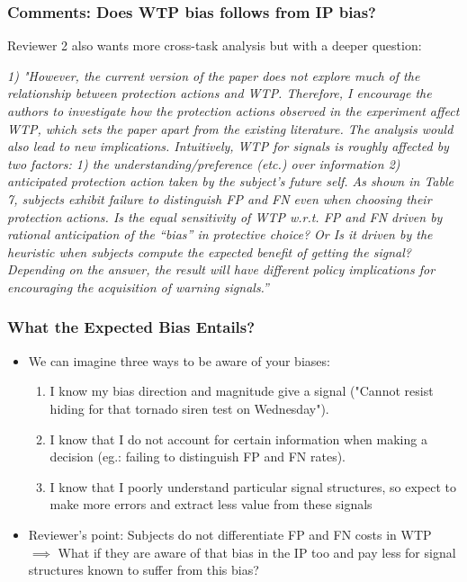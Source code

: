 \documentclass[11pt,hyperref={bookmarks=false}]{beamer}
\begin{document}
\begin{frame}
\frametitle{Comments: Does WTP bias follows from IP bias?}

\parbox{\textwidth} {Reviewer 2 also wants more cross-task analysis but with a deeper question:}
\par
\vspace{1em}
\footnotesize
\parbox{\textwidth}{\textit{1) "However, the current version of the paper does not explore much of the relationship
between protection actions and WTP. Therefore, I encourage the authors to investigate
how the protection actions observed in the experiment affect WTP, which sets
the paper apart from the existing literature. The analysis would also lead to new
implications. Intuitively, WTP for signals is roughly affected by two factors: 1) the
understanding/preference (etc.) over information 2) anticipated protection action
taken by the subject’s future self. As shown in Table 7, subjects exhibit failure to 
distinguish FP and FN even when choosing their protection actions. Is the equal
sensitivity of WTP w.r.t. FP and FN driven by rational anticipation of the “bias”
in protective choice? Or Is it driven by the heuristic when subjects compute the
expected benefit of getting the signal? Depending on the answer, the result will
have different policy implications for encouraging the acquisition of warning signals.”}}
\vspace{10pt}

\end{frame}


\begin{frame}
\frametitle{What the Expected Bias Entails?}

\begin{itemize}
\item We can imagine three ways to be aware of your biases:
\begin{enumerate}
\item  I know my bias direction and magnitude give a signal ("Cannot resist hiding for that  tornado siren test on Wednesday"). 
\item  I know that I do not account for certain information when making a decision (eg.: failing to distinguish FP and FN rates).
\item I know that I poorly understand particular signal structures, so expect to make more errors and extract less value from these signals
\end{enumerate}
\item Reviewer's point: Subjects do not differentiate FP and FN costs in WTP $\implies$ What if they are aware of that bias in the IP too and pay less for signal structures known to suffer from this bias?
\end{itemize}
\end{frame}
\end{document}
